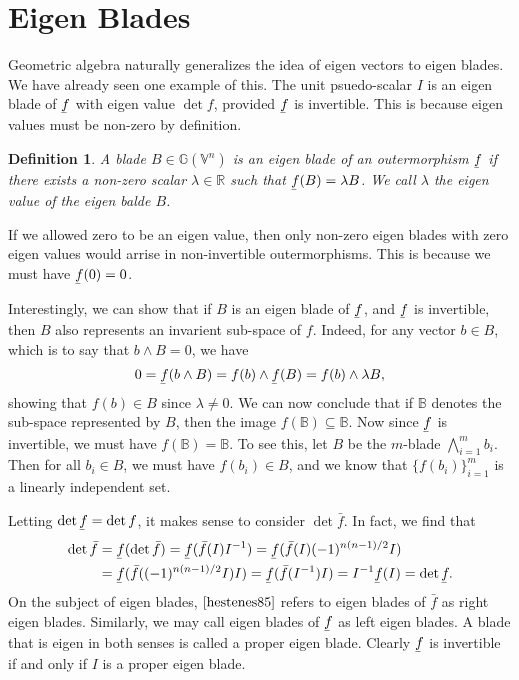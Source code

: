 \documentclass[12pt]{article}
\newcommand{\G}{\mathbb{G}}
\newcommand{\V}{\mathbb{V}}
\newcommand{\R}{\mathbb{R}}
\newcommand{\B}{\mathbb{B}}
\newcommand{\uf}{\underaccent{\bar}{f}}
\newcommand{\of}{\bar{f}}
\newtheorem{definition}{Definition}[section]
\begin{document}
\section{Eigen Blades}

Geometric algebra naturally generalizes the idea of eigen vectors to eigen blades.  We have already
seen one example of this.  The unit psuedo-scalar $I$ is an eigen blade of $\uf$ with eigen value $\det f$,
provided $\uf$ is invertible.  This is because eigen values must be non-zero by definition.
\begin{definition}
A blade $B\in\G(\V^n)$ is an eigen blade of an outermorphism $\uf$ if there exists a non-zero scalar $\lambda\in\R$
such that $\uf(B)=\lambda B$.  We call $\lambda$ the eigen value of the eigen balde $B$.
\end{definition}
If we allowed zero to be an eigen value, then only non-zero eigen blades with zero eigen values
would arrise in non-invertible outermorphisms.  This is because we must have $\uf(0)=0$.

Interestingly, we can show that if $B$ is an eigen blade of $\uf$, and $\uf$ is invertible, then $B$ also represents
an invarient sub-space of $f$.  Indeed, for any vector $b\in B$, which is to say that $b\wedge B=0$, we have
\begin{equation*}
0 = \uf(b\wedge B) = f(b)\wedge\uf(B) = f(b)\wedge \lambda B,
\end{equation*}
showing that $f(b)\in B$ since $\lambda\neq 0$.  We can now conclude that if $\B$ denotes the sub-space represented
by $B$, then the image $f(\B)\subseteq \B$.  Now since $\uf$ is invertible, we must have $f(\B)=\B$.
To see this, let $B$ be the $m$-blade $\bigwedge_{i=1}^m b_i$.  Then for all $b_i\in B$, we
must have $f(b_i)\in B$, and we know that $\{f(b_i)\}_{i=1}^m$ is a linearly independent set.

Letting $\det\uf=\det f$, it makes sense to consider $\det\of$.  In fact, we find that
\begin{align*}
\det\of &= \uf(\det\of) = \uf(\of(I) I^{-1}) = \uf(\of(I)(-1)^{n(n-1)/2}I) \\
 &= \uf(\of((-1)^{n(n-1)/2}I) I) = \uf(\of(I^{-1}) I) = I^{-1}\uf(I) = \det\uf.
\end{align*}
On the subject of eigen blades, $\cite{hestenes85}$ refers to eigen blades of $\of$ as right eigen blades.
Similarly, we may call eigen blades of $\uf$ as left eigen blades.  A blade that is eigen in both senses
is called a proper eigen blade.  Clearly $\uf$ is invertible if and only if $I$ is a proper eigen blade.
\end{document}
